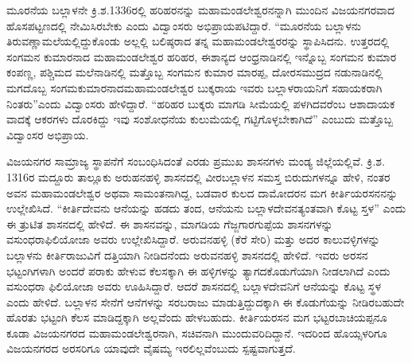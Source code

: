 ಮೂರನೆಯ ಬಲ್ಲಾಳನೇ ಕ್ರಿ.ಶ.1336ರಲ್ಲಿ ಹರಿಹರನನ್ನು ಮಹಾಮಂಡಲೇಶ್ವರನನ್ನಾಗಿ ಮುಂದಿನ ವಿಜಯನಗರವಾದ ಹೊಸಪಟ್ಟಣದಲ್ಲಿ ನೇಮಿಸಿರಬೇಕು ಎಂದು ವಿದ್ವಾಂಸರು ಅಭಿಪ್ರಾಯಪಟಿದ್ದಾರೆ. “ಮೂರನೆಯ ಬಲ್ಲಾಳನು ತಿರುವಣ್ಣಾಮಲೆ\-ಯಲ್ಲಿದ್ದುಕೊಂಡು ಅಲ್ಲಲ್ಲಿ ಬಲಿಷ್ಠರಾದ ತನ್ನ ಮಹಾಮಂಡಲೇಶ್ವರರನ್ನು ಸ್ಥಾಪಿಸಿದನು. ಉತ್ತರದಲ್ಲಿ ಸಂಗಮನ ಕುಮಾರನಾದ ಮಹಾಮಂಡಲೇಶ್ವರ ಹರಿಹರ, ಈಶಾನ್ಯದ ಆಂಧ್ರನಾಡಿನಲ್ಲಿ ಇನ್ನೊಬ್ಬ ಸಂಗಮನ ಕುಮಾರ ಕಂಪಣ್ಣ, ಪಶ್ಚಿಮದ ಮಲೆನಾಡಿನಲ್ಲಿ ಮತ್ತೊಬ್ಬ ಸಂಗಮನ ಕುಮಾರ ಮಾರಪ್ಪ, ದೋರಸಮುದ್ರದ ನಡುನಾಡಿನಲ್ಲಿ ಮಗದೊಬ್ಬ ಸಂಗಮಕುಮಾರನಾದ\break ಮಹಾಮಂಡಲೇಶ್ವರ ಬುಕ್ಕರಾಯ ಇವರು ಬಲ್ಲಾಳರಾಯನಿಗೆ ಸಹಾಯಕರಾಗಿ ನಿಂತರು”ಎಂದು ವಿದ್ವಾಂಸರು ಹೇಳಿದ್ದಾರೆ. “ಹರಿಹರ ಬುಕ್ಕರು ಮಾಗಡಿ ಸೀಮೆಯಲ್ಲಿ ಪಳಗಿದವರೆಂಬ ಆಶಾದಾಯಕ ವಾದಕ್ಕೆ ಆಕರಗಳು ದೊರಕಿದ್ದು ಇವು ಸಂಶೋಧನೆಯ ಕುಲುಮೆಯಲ್ಲಿ ಗಟ್ಟಿಗೊಳ್ಳಬೇಕಾಗಿದೆ” ಎಂಬುದು ಮತ್ತೊಬ್ಬ ವಿದ್ವಾಂಸರ ಅಭಿಪ್ರಾಯ.

ವಿಜಯನಗರ ಸಾಮ್ರಾಜ್ಯ ಸ್ಥಾಪನೆಗೆ ಸಂಬಂಧಿಸಿದಂತೆ ಎರಡು ಪ್ರಮುಖ ಶಾಸನಗಳು ಮಂಡ್ಯ ಜಿಲ್ಲೆಯಲ್ಲಿವೆ. ಕ್ರಿ.ಶ. 1316ರ ಮದ್ದೂರು ತಾಲ್ಲೂಕು ಅರುಹನಹಳ್ಳಿ ಶಾಸನದಲ್ಲಿ ವೀರಬಲ್ಲಾಳನ ಸಮಸ್ತ ಬಿರುದುಗಳನ್ನೂ ಹೇಳಿ, ನಂತರ ಅವನ ಮಹಾಮಂಡಲೇಶ್ವರ ಅಥವಾ ಸಾಮಂತನಾಗಿದ್ದ, ಬಡವಾರ ಕುಲದ ದಾಮೋದರನ ಮಗ ಕೀರ್ತಿಯರಸನನನ್ನು ಉಲ್ಲೇಖಿಸಿದೆ. “ಕೀರ್ತಿದೇವನು ಆನೆಯನ್ನು ಹಡದು ತಂದ, ಆನೆಯನು ಬಲ್ಲಾಳದೇವನತ್ಯಂತವಾಗಿ ಕೊಟ್ಟ ಸ್ತಳ” ಎಂದು ಈ ತ್ರುಟಿತ ಶಾಸನದಲ್ಲಿ ಹೇಳಿದೆ. ಈ ಶಾಸನವನ್ನು, ಮಾಗಡಿಯ ಗೆಜ್ಜಗಾರಗುಪ್ಪೆಯ ಶಾಸನಗಳನ್ನು ವಸುಂಧರಾಫಿಲಿಯೋಜಾ ಅವರು ಉಲ್ಲೇಖಿಸಿದ್ದಾರೆ. ಅರುವನಹಳ್ಳಿ (ಕೆರೆ ಸೇರಿ) ಮತ್ತು ಅದರ ಕಾಲುವಳ್ಳಿಗಳನ್ನು ಬಲ್ಲಾಳನು ಕೀರ್ತಿರಾಜುವಿಗೆ ದತ್ತಿಯಾಗಿ ನೀಡಿದನೆಂದು ಅರುವನಹಳ್ಳಿ ಶಾಸನದಲ್ಲಿ ಹೇಳಿದೆ. ಇವರು ಅರಸನ ಭಟ್ಟಂಗಿಗಳಾಗಿ ಅಂದರೆ ಪರಾಕು ಹೇಳುವ ಕೆಲಸಕ್ಕಾಗಿ ಈ ಹಳ್ಳಿಗಳನ್ನು ತ್ಯಾಗದಕೊಡುಗೆಯಾಗಿ ನೀಡಲಾಗಿದೆ ಎಂದು ವಸುಂಧರಾ ಫಿಲಿಯೋಜಾ ಅವರು ಊಹಿಸಿದ್ದಾರೆ. ಆದರೆ ಶಾಸನದಲ್ಲಿ ಬಲ್ಲಾಳದೇವನಿಗೆ ಆನೆಯನ್ನು ಕೊಟ್ಟ ಸ್ಥಳ ಎಂದು ಹೇಳಿದೆ. ಬಲ್ಲಾಳನ ಸೇನೆಗೆ ಆನೆಗಳನ್ನು ಸರಬರಾಜು ಮಾಡುತ್ತಿದ್ದುದಕ್ಕಾಗಿ ಈ ಕೊಡುಗೆಯನ್ನು ನೀಡಿರಬಹುದೇ ಹೊರತು ಭಟ್ಟಂಗಿ ಕೆಲಸ ಮಾಡಿದ್ದಕ್ಕಾಗಿ ಅಲ್ಲವೆಂದು ಹೇಳಬಹುದು. ಕೀರ್ತಿಯರಸನ ಮಗ ಭಟ್ಟರಬಾಚಿಯಪ್ಪನೂ ಕೂಡಾ ವಿಜಯನಗರದ ಮಹಾಮಂಡಲೇಶ್ವರನಾಗಿ, ಸಚಿವನಾಗಿ ಮುಂದುವರಿದಿದ್ದಾನೆ. ಇದರಿಂದ ಹೊಯ್ಸಳರಿಗೂ ವಿಜಯನಗರದ ಅರಸರಿಗೂ ಯಾವುದೇ ವೈಷಮ್ಯ ಇರಲಿಲ್ಲವೆಂಬುದು ಸ್ಪಷ್ಟವಾಗುತ್ತದೆ.

